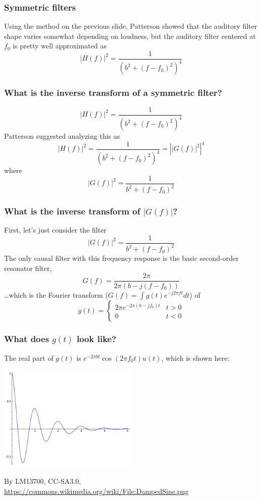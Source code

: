 \begin{frame}
  \frametitle{Symmetric filters}

  Using the method on the previous slide, Patterson showed that the
  auditory filter shape varies somewhat depending on loudness, but the
  auditory filter centered at $f_0$ is pretty well approximated as
  \[
  |H(f)|^2 = \frac{1}{(b^2+(f-f_0)^2)^4}
  \]
\end{frame}

\begin{frame}
  \frametitle{What is the inverse transform of a symmetric filter?}

  \[
  |H(f)|^2 = \frac{1}{(b^2+(f-f_0)^2)^4}
  \]
  Patterson suggested analyzing this as
  \[
  |H(f)|^2 = \frac{1}{(b^2+(f-f_0)^2)^4}= \left||G(f)|^2\right|^4
  \]
  where
  \[
  |G(f)|^2 = \frac{1}{b^2+(f-f_0)^2}
  \]
\end{frame}

\begin{frame}
  \frametitle{What is the inverse transform of $|G(f)|$?}

  First, let's just consider the filter
  \[
  |G(f)|^2 = \frac{1}{b^2+(f-f_0)^2}
  \]
  The only causal filter with this frequency response is the basic
  second-order resonator filter,
  \[
  G(f) = \frac{2\pi}{2\pi (b-j(f-f_0))}
  \]
  \ldots which is the Fourier transform ($G(f)=\int g(t)e^{-j2\pi ft}dt$) of 
  \[
  g(t) = \begin{cases}
    2\pi e^{-2\pi (b-jf_0)t} & t>0\\
    0 & t<0
  \end{cases}
  \]
\end{frame}

\begin{frame}
  \frametitle{What does $g(t)$ look like?}

  The real part of $g(t)$ is $e^{-2\pi bt}\cos(2\pi f_0t)u(t)$, which is
  shown here:
  \centerline{\includegraphics[height=2in]{dampedsine.png}}
  \begin{tiny}
    By LM13700, CC-SA3.0,
    \url{https://commons.wikimedia.org/wiki/File:DampedSine.png}
  \end{tiny}
\end{frame}

